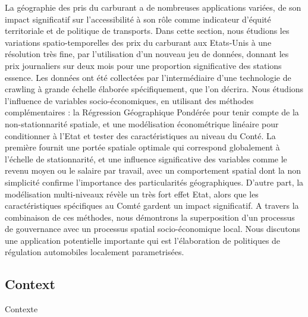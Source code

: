 {La géographie des pris du carburant a de nombreuses applications variées, de son impact significatif sur l'accessibilité à son rôle comme indicateur d'équité territoriale et de politique de transports. Dans cette section, nous étudions les variations spatio-temporelles des prix du carburant aux Etats-Unis à une résolution très fine, par l'utilisation d'un nouveau jeu de données, donnant les prix journaliers sur deux mois pour une proportion significative des stations essence. Les données ont été collectées par l'intermédiaire d'une technologie de crawling à grande échelle élaborée spécifiquement, que l'on décrira. Nous étudions l'influence de variables socio-économiques, en utilisant des méthodes complémentaires : la Régression Géographique Pondérée pour tenir compte de la non-stationnarité spatiale, et une modélisation économétrique linéaire pour conditionner à l'Etat et tester des caractéristiques au niveau du Conté. La première fournit une portée spatiale optimale qui correspond globalement à l'échelle de stationnarité, et une influence significative des variables comme le revenu moyen ou le salaire par travail, avec un comportement spatial dont la non simplicité confirme l'importance des particularités géographiques. D'autre part, la modélisation multi-niveaux révèle un très fort effet Etat, alors que les caractéristiques spécifiques au Comté gardent un impact significatif. A travers la combinaison de ces méthodes, nous démontrons la superposition d'un processus de gouvernance avec un processus spatial socio-économique local. Nous discutons une application potentielle importante qui est l'élaboration de politiques de régulation automobiles localement parametrisées.
}




\subsection{Context}{Contexte}
\label{main}



